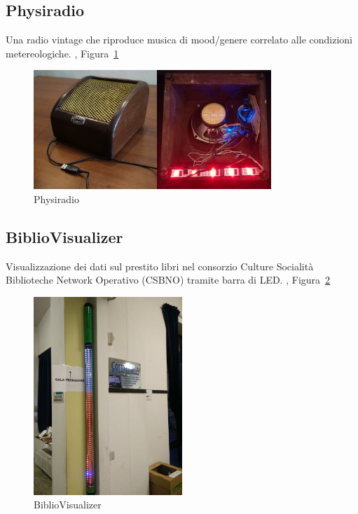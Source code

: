 \documentclass[12pt,a4paper]{report}
\begin{document}

\subsection{Physiradio}
Una radio vintage che riproduce musica di mood/genere correlato alle condizioni metereologiche. \cite{physiradio}, Figura~\ref{fig:physiradio}
\begin{figure}[h]
  \centering
  \includegraphics[width=0.8\textwidth]{physiradio}
  \caption{Physiradio}
  \label{fig:physiradio}
\end{figure}

\subsection{BiblioVisualizer}
Visualizzazione dei dati sul prestito libri nel consorzio Culture Socialità Biblioteche Network Operativo (CSBNO) tramite barra di LED.
\cite{bibliovisgitlab}, Figura~\ref{fig:bibliovisualizer}
\begin{figure}[h]
  \centering
  \includegraphics[width=0.5\textwidth]{bibliovisualizer}
  \caption{BiblioVisualizer}
  \label{fig:bibliovisualizer}
\end{figure}
\end{document}
